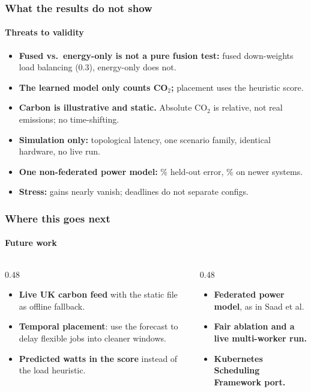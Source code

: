 \documentclass[aspectratio=169,11pt]{beamer}
\begin{document}
\begin{frame}[t]
\frametitle{What the results do not show}
\framesubtitle{Threats to validity}
\small
\begin{itemize}
\item \textbf{Fused vs.\ energy-only is not a pure fusion test:} fused down-weights load balancing (0.3), energy-only does not.
\item \textbf{The learned model only counts CO$_2$;} placement uses the heuristic score.
\item \textbf{Carbon is illustrative and static.} Absolute CO$_2$ is relative, not real emissions; no time-shifting.
\item \textbf{Simulation only:} topological latency, one scenario family, identical hardware, no live run.
\item \textbf{One non-federated power model:} \MapeXgb\% held-out error, \MapeTemporal\% on newer systems.
\item \textbf{Stress:} gains nearly vanish; deadlines do not separate configs.
\end{itemize}
\end{frame}

\begin{frame}[t]
\frametitle{Where this goes next}
\framesubtitle{Future work}
\begin{columns}[T]
\begin{column}{0.48\textwidth}
\begin{itemize}\small
\item \textbf{Live UK carbon feed} with the static file as offline fallback.
\item \textbf{Temporal placement}: use the forecast to delay flexible jobs into cleaner windows.
\item \textbf{Predicted watts in the score} instead of the load heuristic.
\end{itemize}
\end{column}
\begin{column}{0.48\textwidth}
\begin{itemize}\small
\item \textbf{Federated power model}, as in Saad et al.
\item \textbf{Fair ablation and a live multi-worker run.}
\item \textbf{Kubernetes Scheduling Framework port.}
\end{itemize}
\end{column}
\end{columns}
\end{frame}
\end{document}
